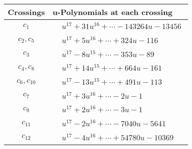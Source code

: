 \documentclass[1p]{elsarticle_modified}
\theoremstyle{definition}
\begin{document}
\begin{tabular}{m{50pt}|m{274pt}}
Crossings & \hspace{64pt}u-Polynomials at each crossing \\
\hline $$\begin{aligned}c_{1}\end{aligned}$$&$\begin{aligned}
&u^{17}+31 u^{16}+\cdots-143264 u-13456
\end{aligned}$\\
\hline $$\begin{aligned}c_{2},c_{5}\end{aligned}$$&$\begin{aligned}
&u^{17}+5 u^{16}+\cdots+324 u-116
\end{aligned}$\\
\hline $$\begin{aligned}c_{3}\end{aligned}$$&$\begin{aligned}
&u^{17}-8 u^{15}+\cdots-353 u-89
\end{aligned}$\\
\hline $$\begin{aligned}c_{4},c_{8}\end{aligned}$$&$\begin{aligned}
&u^{17}+14 u^{15}+\cdots+664 u-161
\end{aligned}$\\
\hline $$\begin{aligned}c_{6},c_{10}\end{aligned}$$&$\begin{aligned}
&u^{17}-13 u^{15}+\cdots+491 u-113
\end{aligned}$\\
\hline $$\begin{aligned}c_{7}\end{aligned}$$&$\begin{aligned}
&u^{17}+3 u^{16}+\cdots-2 u-1
\end{aligned}$\\
\hline $$\begin{aligned}c_{9}\end{aligned}$$&$\begin{aligned}
&u^{17}+2 u^{16}+\cdots-3 u-1
\end{aligned}$\\
\hline $$\begin{aligned}c_{11}\end{aligned}$$&$\begin{aligned}
&u^{17}-2 u^{16}+\cdots-7040 u-5641
\end{aligned}$\\
\hline $$\begin{aligned}c_{12}\end{aligned}$$&$\begin{aligned}
&u^{17}-4 u^{16}+\cdots+54780 u-10369
\end{aligned}$\\
\hline
\end{tabular}\\~\\
\end{document}
